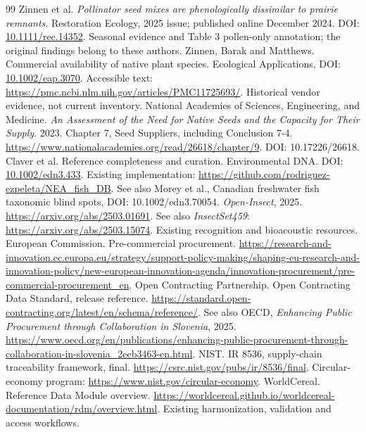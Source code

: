 \begin{thebibliography}{99}
\small
{} Zinnen et al. \emph{Pollinator seed mixes are phenologically dissimilar to prairie remnants}. Restoration Ecology, 2025 issue; published online December 2024. DOI: \href{https://doi.org/10.1111/rec.14352}{10.1111/rec.14352}. Seasonal evidence and Table 3 pollen-only annotation; the original findings belong to these authors.
 Zinnen, Barak and Matthews. Commercial availability of native plant species. Ecological Applications, DOI: \href{https://doi.org/10.1002/eap.3070}{10.1002/eap.3070}. Accessible text: \url{https://pmc.ncbi.nlm.nih.gov/articles/PMC11725693/}. Historical vendor evidence, not current inventory.
 National Academies of Sciences, Engineering, and Medicine. \emph{An Assessment of the Need for Native Seeds and the Capacity for Their Supply}. 2023. Chapter 7, Seed Suppliers, including Conclusion 7-4. \url{https://www.nationalacademies.org/read/26618/chapter/9}. DOI: 10.17226/26618.
 Claver et al. Reference completeness and curation. Environmental DNA. DOI: \href{https://doi.org/10.1002/edn3.433}{10.1002/edn3.433}. Existing implementation: \url{https://github.com/rodriguez-ezpeleta/NEA_fish_DB}. See also Morey et al., Canadian freshwater fish taxonomic blind spots, DOI: 10.1002/edn3.70054.
 \emph{Open-Insect}, 2025. \url{https://arxiv.org/abs/2503.01691}. See also \emph{InsectSet459}: \url{https://arxiv.org/abs/2503.15074}. Existing recognition and bioacoustic resources.
 European Commission. Pre-commercial procurement. \url{https://research-and-innovation.ec.europa.eu/strategy/support-policy-making/shaping-eu-research-and-innovation-policy/new-european-innovation-agenda/innovation-procurement/pre-commercial-procurement_en}.
 Open Contracting Partnership. Open Contracting Data Standard, release reference. \url{https://standard.open-contracting.org/latest/en/schema/reference/}. See also OECD, \emph{Enhancing Public Procurement through Collaboration in Slovenia}, 2025. \url{https://www.oecd.org/en/publications/enhancing-public-procurement-through-collaboration-in-slovenia_2eeb3463-en.html}.
 NIST. IR 8536, supply-chain traceability framework, final. \url{https://csrc.nist.gov/pubs/ir/8536/final}. Circular-economy program: \url{https://www.nist.gov/circular-economy}.
 WorldCereal. Reference Data Module overview. \url{https://worldcereal.github.io/worldcereal-documentation/rdm/overview.html}. Existing harmonization, validation and access workflows.

\end{thebibliography}
